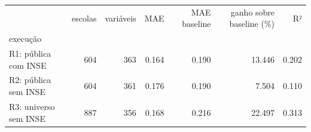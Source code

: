 \begin{tabular}{lrrrrrr}
\toprule
 & escolas & variáveis & MAE & MAE baseline & ganho sobre baseline (\%) & R² \\
execução &  &  &  &  &  &  \\
\midrule
R1: pública com INSE & 604 & 363 & 0.164 & 0.190 & 13.446 & 0.202 \\
R2: pública sem INSE & 604 & 361 & 0.176 & 0.190 & 7.504 & 0.110 \\
R3: universo sem INSE & 887 & 356 & 0.168 & 0.216 & 22.497 & 0.313 \\
\bottomrule
\end{tabular}
